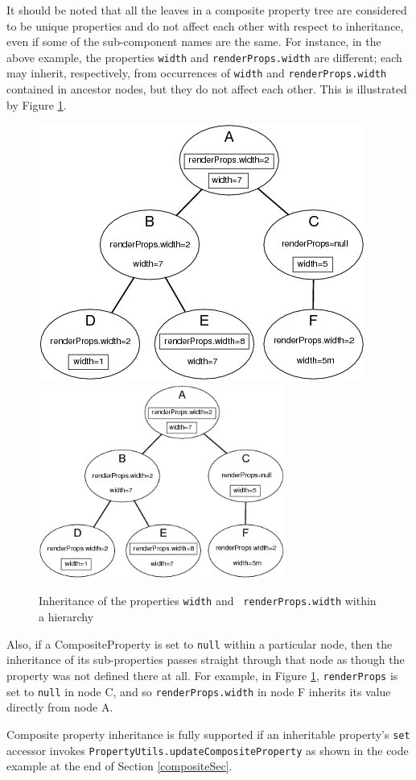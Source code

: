 It should be noted that all the leaves in a composite property tree
are considered to be unique properties and do not affect each other
with respect to inheritance, even if some of the sub-component names
are the same. For instance, in the above example, the properties 
{\tt width} and {\tt renderProps.width} are different; each may inherit,
respectively, from occurrences of {\tt width} and 
{\tt renderProps.width} contained in ancestor nodes, but they do not affect
each other. This is illustrated by Figure \ref{compositesFig}.

\begin{figure}
\begin{center}
\iflatexml
\includegraphics[]{images/composites}
\else
\includegraphics[height=2.5in]{images/composites}
\fi
\end{center}
\caption{Inheritance of the properties {\tt width} and {\tt
renderProps.width} within a hierarchy}%
\label{compositesFig}
\end{figure}

Also, if a CompositeProperty is set to {\tt null} within a particular
node, then the inheritance of its sub-properties passes straight
through that node as though the property was not defined there at
all. For example, in Figure \ref{compositesFig}, {\tt renderProps} is
set to {\tt null} in node C, and so {\tt renderProps.width} in node F
inherits its value directly from node A.

Composite property inheritance is fully supported if an inheritable
property's {\tt set} accessor invokes 
{\tt PropertyUtils.update\-CompositeProperty} as shown in the code example at
the end of Section \ref{compositeSec}.

